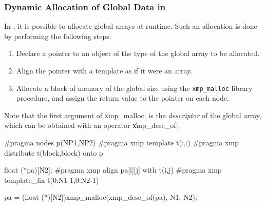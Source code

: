 

\subsubsection{Dynamic Allocation of Global Data in {\XMPC}}
\label{sec:Dynamic Allocation of Global Data in C}

In {\XMPC}, it is possible to allocate global arrays at runtime.
%
Such an allocation is done by performing the following steps.
%
\begin{enumerate}
 \item Declare a pointer to an object of the type of the global array to
       be allocated.
 \item Align the pointer with a template as if it were an array.
 \item Allocate a block of memory of the global size using the {\tt xmp\_malloc}
       library procedure, and assign the return value to the
       pointer on each node.
\end{enumerate}

Note that the first argument of \|xmp_malloc| is the {\it descriptor} of
the global array, which can be obtained with an operator \|xmp_desc_of|.

\begin{XCexample}
#pragma nodes p(NP1,NP2)
#pragma xmp template t(:,:)
#pragma xmp distribute t(block,block) onto p

float (*pa)[N2];
#pragma xmp align pa[i][j] with t(i,j)
#pragma xmp template_fix t(0:N1-1,0:N2-1)

pa = (float (*)[N2])xmp_malloc(xmp_desc_of(pa), N1, N2);
\end{XCexample}


